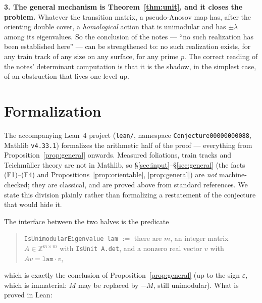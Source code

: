 \documentclass[11pt]{article}
\theoremstyle{plain}
\theoremstyle{definition}
\theoremstyle{remark}
\newcommand{\ZZ}{\mathbb{Z}}
\begin{document}
\smallskip
\noindent\textbf{3. The general mechanism is Theorem~\ref{thm:unit}, and it closes
the problem.} Whatever the transition matrix, a pseudo-Anosov map has, after the
orienting double cover, a \emph{homological} action that is unimodular and has
$\pm\lambda$ among its eigenvalues. So the conclusion of the notes --- ``no such
realization has been established here'' --- can be strengthened to: no such
realization exists, for any train track of any size on any surface, for any prime
$p$. The correct reading of the notes' determinant computation is that it is the
shadow, in the simplest case, of an obstruction that lives one level up.

\section{Formalization}\label{sec:formal}

The accompanying Lean~4 project (\texttt{lean/}, namespace
\texttt{Conjecture00000000088}, Mathlib \texttt{v4.33.1}) formalizes the
arithmetic half of the proof --- everything from
Proposition~\ref{prop:general} onwards. Measured foliations, train tracks and
Teichmüller theory are not in Mathlib, so \S\ref{sec:input}--\S\ref{sec:general}
(the facts (F1)--(F4) and Propositions~\ref{prop:orientable},
\ref{prop:general}) are \emph{not} machine-checked; they are classical, and are
proved above from standard references. We state this division plainly rather than
formalizing a restatement of the conjecture that would hide it.

The interface between the two halves is the predicate
\begin{quote}
\texttt{IsUnimodularEigenvalue lam} $:=$ there are $m$, an integer matrix
$A\in\ZZ^{m\times m}$ with \texttt{IsUnit A.det}, and a nonzero real vector $v$
with $A v=\texttt{lam}\cdot v$,
\end{quote}
which is exactly the conclusion of Proposition~\ref{prop:general} (up to the sign
$\varepsilon$, which is immaterial: $M$ may be replaced by $-M$, still
unimodular). What is proved in Lean:
\end{document}
